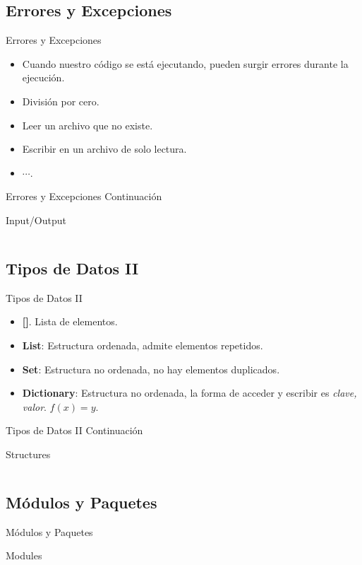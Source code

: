 \documentclass[usenames, dvipsnames, compress]{beamer}
\begin{document}
	\subsection{Errores y Excepciones}
		\begin{frame}{Errores y Excepciones}
		\begin{itemize}[<+- | alert@ +>]
			\item Cuando nuestro código se está ejecutando, pueden surgir errores durante la ejecución.
			\item División por cero.
			\item Leer un archivo que no existe.
			\item Escribir en un archivo de solo lectura.
			\item $\cdots$.
		\end{itemize}
		\end{frame}
		\begin{frame}{Errores y Excepciones Continuación}
		\begin{block}{Input/Output}
			\inputminted[xleftmargin=\parindent,linenos]{python}{codes/exceptions.py}
		\end{block}
		\end{frame}
		\subsection{Tipos de Datos II}
		\begin{frame}{Tipos de Datos II}
			\begin{itemize}[<+- | alert@ +>]
				\item \textbf{[]}. Lista de elementos.
				\item \textbf{List}: Estructura ordenada, admite elementos repetidos. 
				\item \textbf{Set}: Estructura no ordenada, no hay elementos duplicados.
				\item \textbf{Dictionary}: Estructura no ordenada, la forma de acceder y escribir es \textit{clave, valor}. $f(x) = y$.
			\end{itemize}
		\end{frame}
		\begin{frame}{Tipos de Datos II Continuación}
			\begin{block}{Structures}
				\inputminted[xleftmargin=\parindent,linenos]{python}{codes/structures.py}
			\end{block}
		\end{frame}
		\subsection{Módulos y Paquetes}
		\begin{frame}{Módulos y Paquetes}
			\begin{block}{Modules}
				\inputminted[xleftmargin=\parindent,linenos]{python}{codes/modules.py}
			\end{block}
		\end{frame}
\end{document}
